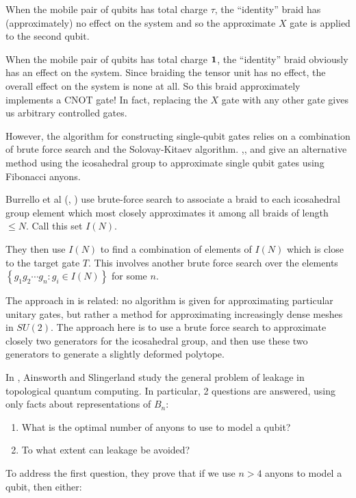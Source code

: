 When the mobile pair of qubits has total charge $\tau$, the ``identity'' braid
has (approximately) no effect on the system and so the approximate $X$ gate is
applied to the second qubit.

When the mobile pair of qubits has total charge $\mathbf{1}$, the ``identity'' braid
obviously has an effect on the system. Since braiding the tensor unit has no
effect, the overall effect on the system is none at all. So this braid
approximately implements a CNOT gate! In fact, replacing the $X$ gate with any
other gate gives us arbitrary controlled gates.

However, the algorithm for constructing single-qubit gates relies on a
combination of brute force search and the Solovay-Kitaev algorithm.
\cite{Burrello2010},\cite{Burrello2011}, and \cite{Mosseri2008} give an
alternative method using the icosahedral group to approximate single qubit
gates using Fibonacci anyons. 

Burrello et al (\cite{Burrello2010}, \cite{Burrello2011}) use brute-force
search to associate a braid to each icosahedral group element which most
closely approximates it among all braids of length $\leq N$. Call this set
$I(N)$.

They then use $I(N)$ to find a combination of elements of $I(N)$ which is close
to the target gate $T$. This involves another brute force search over the
elements $\left\{ g_1g_2\cdots g_n: g_i \in I(N) \right\}$ for some $n$. 

The approach in \cite{Mosseri2008} is related: no algorithm is given
for approximating particular unitary gates, but rather a method for
approximating increasingly dense meshes in $SU(2)$. The approach here is to
use a brute force search to approximate closely two generators for the
icosahedral group, and then use these two generators to generate a slightly
deformed polytope.

In \cite{Ainsworth2011}, Ainsworth and Slingerland study the general problem of
leakage in topological quantum computing.  In particular, 2 questions are
answered, using only facts about representations of $B_n$:

\begin{enumerate}
\item What is the optimal number of anyons to use to model a qubit?
\item To what extent can leakage be avoided?
\end{enumerate}

To address the first question, they prove that if we use $n > 4$ anyons to
model a qubit, then either:


